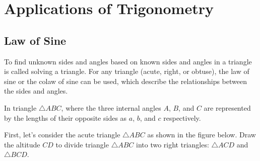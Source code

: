 \documentclass{report}
\begin{document}
\pagestyle{fancy}
\fancyhead{} %
\fancyhead[RO,LE]{\thepage}
\fancyhead[LO,RE]{\leftmark}
\fancyfoot{} %

\fancyfoot[RO,RE]{\thepage}

\onehalfspacing
\setcounter{chapter}{9}

\chapter{Applications of Trigonometry}

\section{Law of Sine}

To find unknown sides and angles based on known sides and angles in a triangle is called solving a triangle. For any triangle (acute, right, or obtuse), the law of sine or the colaw of sine can be used, which describe the relationships between the sides and angles.

In triangle $\triangle ABC$, where the three internal angles $A$, $B$, and $C$ are represented by the lengths of their opposite sides as $a$, $b$, and $c$ respectively.

First, let's consider the acute triangle $\triangle ABC$ as shown in the figure below. Draw the altitude $CD$ to divide triangle $\triangle ABC$ into two right triangles: $\triangle ACD$ and $\triangle BCD$.
\end{document}
